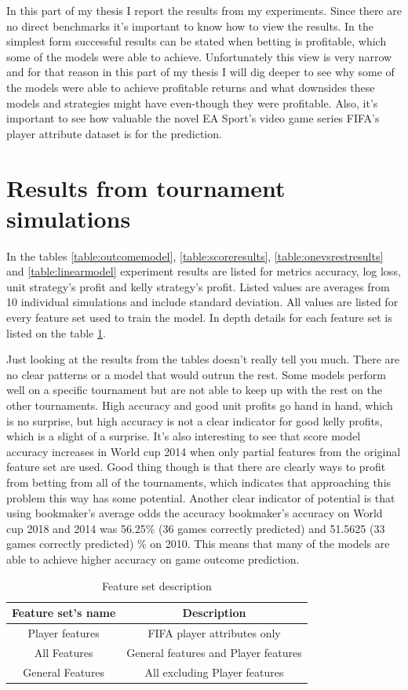 In this part of my thesis I report the results from my experiments. Since there are no direct benchmarks it's important to know how to view the results. In the simplest form successful results can be stated when betting is profitable, which some of the models were able to achieve. Unfortunately this view is very narrow and for that reason in this part of my thesis I will dig deeper to see why some of the models were able to achieve profitable returns and what downsides these models and strategies might have even-though they were profitable. Also, it's important to see how valuable the novel EA Sport's video game series FIFA's player attribute dataset is for the prediction.

\section{Results from tournament simulations}
In the tables \ref{table:outcomemodel}, \ref{table:scoreresults}, \ref{table:onevsrestresults} and \ref{table:linearmodel} experiment results are listed for metrics accuracy, log loss, unit strategy's profit and kelly strategy's profit. Listed values are averages from 10 individual simulations and include standard deviation. All values are listed for every feature set used to train the model. In depth details for each feature set is listed on the table \ref{table:featuresetlist}.

Just looking at the results from the tables doesn't really tell you much. There are no clear patterns or a model that would outrun the rest. Some models perform well on a specific tournament but are not able to keep up with the rest on the other tournaments. High accuracy and good unit profits go hand in hand, which is no surprise, but high accuracy is not a clear indicator for good kelly profits, which is a slight of a surprise. It's also interesting to see that score model accuracy increases in World cup 2014 when only partial features from the original feature set are used. Good thing though is that there are clearly ways to profit from betting from all of the tournaments, which indicates that approaching this problem this way has some potential. Another clear indicator of potential is that using bookmaker's average odds the accuracy bookmaker's accuracy on World cup 2018 and 2014 was 56.25\% (36 games correctly predicted) and 51.5625 (33 games correctly predicted) \% on 2010. This means that many of the models are able to achieve higher accuracy on game outcome prediction.

\begin{table}
    \caption{Feature set description}
    \begin{tabular}{| c | c|}
        \hline
        Feature set's name & Description \\
        \hline
        Player features & FIFA player attributes only \\
        All Features & General features and Player features \\
        General Features & All excluding Player features \\
        \hline
    \end{tabular}
    \label{table:featuresetlist}
\end{table}

